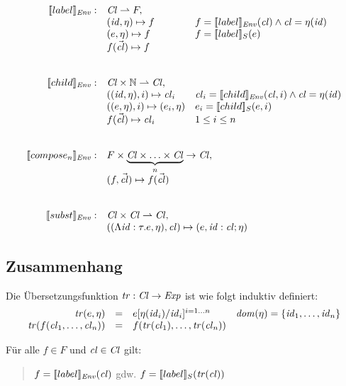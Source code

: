 \documentclass[12pt,a4paper,draft]{article}
\begin{document}
\[\begin{array}{rll}
  \sem{label}_\Env: & \Cl \pto F, \\
  & (\id,\eta) \mapsto f & f = \sem{label}_\Env(\cl) \wedge \cl = \eta(\id) \\
  & (e,\eta) \mapsto f & f = \sem{label}_S(e) \\
  & f(\vec{\cl}) \mapsto f \\
  \\\\
  \sem{child}_\Env: & \Cl \times \N \pto \Cl, \\
  & ((\id,\eta),i) \mapsto \cl_i & \cl_i = \sem{child}_\Env(\cl, i) \wedge \cl = \eta(\id) \\
  & ((e,\eta),i) \mapsto (e_i,\eta) & e_i = \sem{child}_S(e,i) \\
  & f(\vec{\cl}) \mapsto \cl_i & 1 \le i \le n \\
  \\\\
  \sem{compose_n}_\Env: & \multicolumn{2}{l}{F \times \underbrace{\Cl \times \ldots \times \Cl}_n \to \Cl,} \\
  & \multicolumn{2}{l}{(f,\vec{\cl}) \mapsto f(\vec{\cl})} \\
  \\\\
  \sem{subst}_\Env: & \multicolumn{2}{l}{\Cl \times \Cl \pto \Cl,} \\
  & \multicolumn{2}{l}{((\Lambda\id:\tau.e,\eta),\cl) \mapsto (e,\id:\cl;\eta)}
\end{array}\]


\subsection*{Zusammenhang}

Die \"Ubersetzungsfunktion $\mathit{tr}:\mathit{Cl}\to\mathit{Exp}$ ist wie folgt induktiv definiert:
\[\begin{array}{rcll}
  \mathit{tr}(e,\eta)
  &=& e[\eta(\mathit{id}_i)/\mathit{id}_i]^{i=1 \ldots n}
  & \mathit{dom}(\eta) = \{\mathit{id}_1,\ldots,\mathit{id}_n\}
  \\
  \mathit{tr}(f(\mathit{cl}_1,\ldots,\mathit{cl}_n))
  &=& f(\mathit{tr}(\mathit{cl}_1),\ldots,\mathit{tr}(\mathit{cl}_n))
\end{array}\]

\begin{lemma}
  F\"ur alle $f \in F$ und $\mathit{cl} \in \mathit{Cl}$ gilt:
  \begin{quote}
  $f = [\![label]\!]_{\mathit{Env}}(\mathit{cl})$ gdw. $f = [\![label]\!]_S(\mathit{tr}(\mathit{cl}))$
  \end{quote}
\end{lemma}
\end{document}
